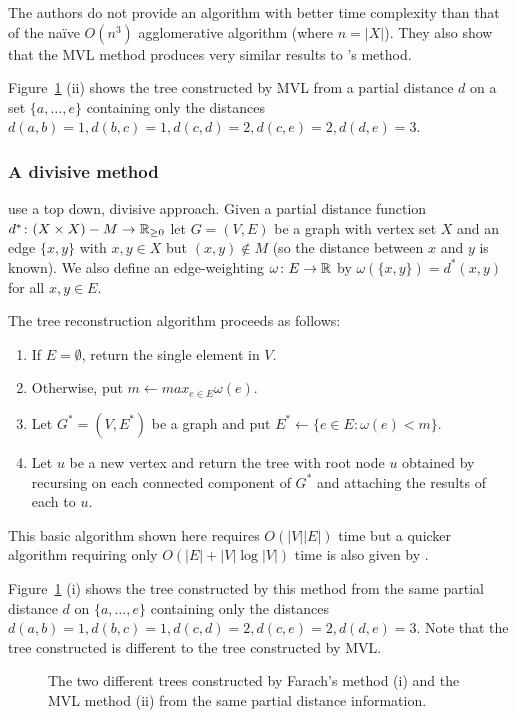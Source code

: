 The authors do not provide an algorithm with better time complexity than that
of the naïve $O(n^3)$ agglomerative algorithm (where $n = |X|$).  They also
show that the MVL method produces very similar results to
\citeauthor{de1984ultrametric}'s method.

Figure~\ref{fig:farach-mvl-ex} (ii) shows the tree constructed by MVL from a
partial distance $d$ on a set $\{a,\dotsc,e\}$ containing only the distances
$d(a,b)=1, d(b,c)=1, d(c,d)=2, d(c,e)=2, d(d,e)=3$.

\subsubsection{A divisive method}
\label{sec:part-dist-divisive-method}

\citet{farach1995robust} use a top down, divisive approach.  Given a partial
distance function $d^* \colon (X \times X) - M \to {\mathbb R}_{\geq 0}$ let $G=(V,E)$ be a
graph with vertex set $X$ and an edge $\{x,y\}$ with $x,y \in X$ but $(x,y)
\notin M$ (so the distance between $x$ and $y$ is known).  We also define an
edge-weighting $\omega \colon E \to {\mathbb R}$ by $\omega(\{x,y\}) = d^*(x,y)$ for
all $x,y \in E$.

The tree reconstruction algorithm proceeds as follows:
\begin{enumerate}
\item If $E = \emptyset$, return the single element in $V$.
\item Otherwise, put $m \gets max_{e \in E} \omega(e)$.
\item Let $G^* = (V,E^*)$ be a graph and put $E^* \gets \{e \in E \colon
  \omega(e) < m\}$.
\item Let $u$ be a new vertex and return the tree with root node $u$ obtained
  by recursing on each connected component of $G^*$ and attaching the results
  of each to $u$.               %
\end{enumerate}
This basic algorithm shown here requires $O(|V||E|)$ time but a quicker
algorithm requiring only $O(|E| + |V|\log |V|)$ time is also given by
\cite{farach1995robust}.

Figure~\ref{fig:farach-mvl-ex} (i) shows the tree constructed by this method
from the same partial distance $d$ on $\{a,\dotsc,e\}$ containing only the
distances $d(a,b)=1, d(b,c)=1, d(c,d)=2, d(c,e)=2, d(d,e)=3$.  Note that the
tree constructed is different to the tree constructed by MVL.

\begin{figure}
  \centering
  
  \caption{The two different trees constructed by Farach's method (i) and the
    MVL method (ii) from the same partial distance information.}
  \label{fig:farach-mvl-ex}
\end{figure}

